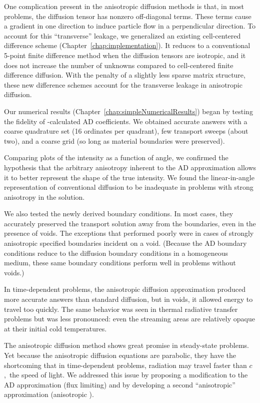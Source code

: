 One complication present in the anisotropic diffusion methods is
that, in most problems, the diffusion tensor has nonzero off-diagonal terms.
These terms cause a gradient in one direction to induce particle flow in a
perpendicular direction. To account for this ``transverse'' leakage, we
generalized
an existing cell-centered difference scheme (Chapter~\ref{chap:implementation}).
It reduces to a conventional 5-point finite difference method when the diffusion
tensors are isotropic, and it does not increase the number of unknowns compared
to cell-centered finite difference diffusion. With the penalty of a slightly
less sparse matrix structure, these new difference schemes account for the
transverse leakage in anisotropic diffusion.

Our numerical results (Chapter~\ref{chap:simpleNumericalResults}) began by
testing the fidelity of \SN-calculated AD coefficients. We obtained accurate
answers with a coarse quadrature set (16 ordinates per quadrant), few
transport sweeps (about two), and a coarse grid (so long as material boundaries
were preserved).

Comparing plots of the intensity as a function of angle, we confirmed the
hypothesis that the arbitrary anisotropy inherent to the AD approximation
allows it to better represent the shape of the true intensity. We found
the linear-in-angle representation of conventional diffusion to be inadequate
in problems with strong anisotropy in the solution.

We also tested the newly derived boundary conditions. In most cases, they
accurately preserved the transport solution away from the boundaries, even in
the presence of voids. The exceptions that performed poorly were in cases of
strongly anisotropic specified boundaries incident on a void. (Because the AD
boundary
conditions reduce to the diffusion boundary conditions in a homogeneous medium,
these same boundary conditions perform well in problems without voids.)

In time-dependent problems, the anisotropic diffusion approximation produced
more accurate answers than standard diffusion, but in voids, it allowed energy
to travel too quickly. The same behavior was seen in thermal radiative transfer
problems but was less pronounced: even the streaming areas are
relatively opaque at their initial cold temperatures.

The anisotropic diffusion method shows great promise in steady-state problems.
Yet because the anisotropic diffusion equations are parabolic, they have the
shortcoming that in time-dependent problems, radiation may travel faster than
$c$,~the speed of light. We addressed this issue by proposing a modification to
the AD approximation (flux limiting) and by developing a second ``anisotropic''
approximation (anisotropic \Pone).

